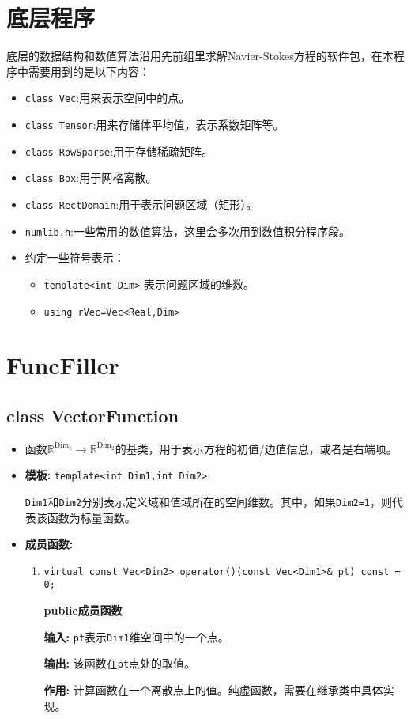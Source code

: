 \documentclass[UTF8]{ctexart}
\theoremstyle{plain}
\theoremstyle{definition}
\theoremstyle{remark}
\begin{document}
\section{底层程序}
底层的数据结构和数值算法沿用先前组里求解Navier-Stokes方程的软件包，在本程序中需要用到的是以下内容：
\begin{itemize}
    \item \texttt{class Vec}:用来表示空间中的点。
    \item \texttt{class Tensor}:用来存储体平均值，表示系数矩阵等。
    \item \texttt{class RowSparse}:用于存储稀疏矩阵。
    \item \texttt{class Box}:用于网格离散。
    \item \texttt{class RectDomain}:用于表示问题区域（矩形）。
    \item \texttt{numlib.h}:一些常用的数值算法，这里会多次用到数值积分程序段。
    \item 约定一些符号表示：
    \begin{itemize}
        \item \texttt{template<int Dim>} 表示问题区域的维数。
        \item \texttt{using rVec=Vec<Real,Dim>}
    \end{itemize}
\end{itemize}
\section{FuncFiller}
\subsection{class VectorFunction}
\begin{itemize}
    \item 函数$\mathbb{R}^{\text{Dim}_{1}}\rightarrow\mathbb{R}^{\text{Dim}_{2}}$的基类，用于表示方程的初值/边值信息，或者是右端项。
    \item \textbf{模板:} \texttt{template<int Dim1,int Dim2>}:
    
    \texttt{Dim1}和\texttt{Dim2}分别表示定义域和值域所在的空间维数。其中，如果\texttt{Dim2=1}，则代表该函数为标量函数。
    \item \textbf{成员函数:}
    \begin{enumerate}
    \item \texttt{virtual const Vec<Dim2> operator()(const Vec<Dim1>\& pt) const = 0;}

      \textbf{public成员函数}

      \textbf{输入:} \texttt{pt}表示\texttt{Dim1}维空间中的一个点。

      \textbf{输出:} 该函数在\texttt{pt}点处的取值。

      \textbf{作用:} 计算函数在一个离散点上的值。纯虚函数，需要在继承类中具体实现。
    \end{enumerate}
\end{itemize}
\end{document}
